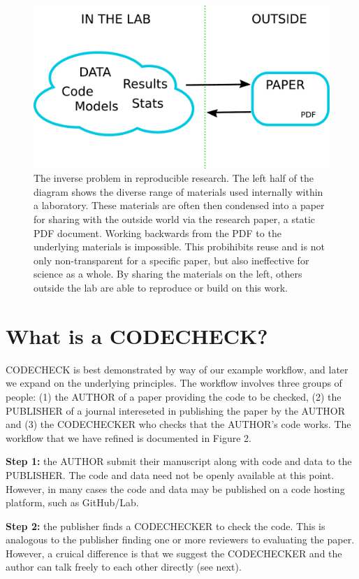 \documentclass[12pt]{article}
\begin{document}
\begin{figure}
  \centering
  \includegraphics[width=\textwidth]{figs/rr.pdf}
  \caption{The inverse problem in reproducible research.  The left
  half of the diagram shows the diverse range of materials used
  internally within a laboratory.  These materials are often then
  condensed into a paper for sharing with the outside world via the
  research paper, a static PDF document.  Working backwards from the
  PDF to the underlying materials is impossible. This probihibits reuse
  and is not only non-transparent for a specific paper, but also 
  ineffective for science as a whole. By sharing the
  materials on the left, others outside the lab are able to reproduce
  or build on this work.}
  \label{fig:inverse}
\end{figure}

\section*{What is a CODECHECK?}\label{what-is-a-codecheck}

CODECHECK is best demonstrated by way of our example workflow, and later
we expand on the underlying principles. The workflow involves three
groups of people: (1) the AUTHOR of a paper providing the code to be checked, (2)
the PUBLISHER of a journal intereseted in publishing the paper by the
AUTHOR and (3) the CODECHECKER who checks that the AUTHOR's code works.
The workflow that we have refined is documented in Figure 2.

\textbf{Step 1:} the AUTHOR submit their manuscript along with code and data to
the PUBLISHER. The code and data need not be openly available at this point.
However, in many cases the code and data may be published on a code hosting platform,
such as GitHub/Lab.

\textbf{Step 2:} the publisher finds a CODECHECKER to check the code. This is
analogous to the publisher finding one or more reviewers to evaluating
the paper. However, a cruical difference is that we suggest the CODECHECKER
and the author can talk freely to each other directly (see next).
\end{document}
